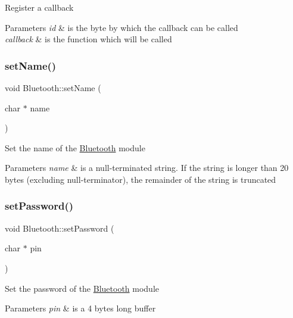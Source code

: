 Register a callback


\begin{DoxyParams}{Parameters}
{\em id} & is the byte by which the callback can be called \\
\hline
{\em callback} & is the function which will be called \\
\hline
\end{DoxyParams}
\mbox{\label{namespace_bluetooth_a75f8c76cf9fea1f13426ada5be430673}} 
\subsubsection{\texorpdfstring{setName()}{setName()}}
{\footnotesize\ttfamily void Bluetooth\+::set\+Name (\begin{DoxyParamCaption}\item[{char $\ast$}]{name }\end{DoxyParamCaption})}

Set the name of the \mbox{\hyperlink{namespace_bluetooth}{Bluetooth}} module


\begin{DoxyParams}{Parameters}
{\em name} & is a null-\/terminated string. If the string is longer than 20 bytes (excluding null-\/terminator), the remainder of the string is truncated \\
\hline
\end{DoxyParams}
\mbox{\label{namespace_bluetooth_a180dbaf21f449e085983a7d2443d24f6}} 
\subsubsection{\texorpdfstring{setPassword()}{setPassword()}}
{\footnotesize\ttfamily void Bluetooth\+::set\+Password (\begin{DoxyParamCaption}\item[{char $\ast$}]{pin }\end{DoxyParamCaption})}

Set the password of the \mbox{\hyperlink{namespace_bluetooth}{Bluetooth}} module


\begin{DoxyParams}{Parameters}
{\em pin} & is a 4 bytes long buffer \\
\hline
\end{DoxyParams}
